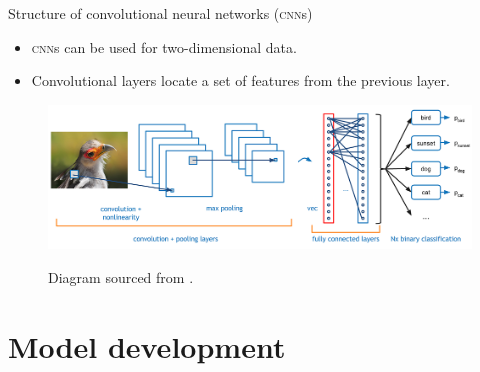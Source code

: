\documentclass{beamer}
\begin{document}
\begin{frame}{Structure of convolutional neural networks (\textsc{cnn}s)}
\begin{itemize}
\item \textsc{cnn}s can be used for two-dimensional data.
\item Convolutional layers locate a set of features from the previous layer.
\end{itemize}
\begin{figure}
\centering
\includegraphics[width=\linewidth]{../Thesis_Docs/Images/4_cnn_structure.png}

\small{Diagram sourced from \citep{ADeshpande2016}.}
\end{figure}
\end{frame}



\section{Model development}
\end{document}
